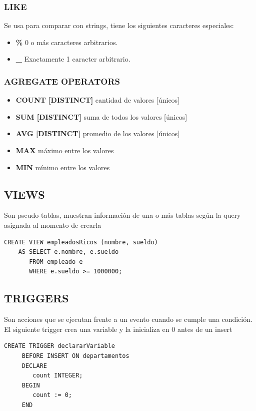 \documentclass[11pt,letterpaper]{article}
\begin{document}
\subsubsection{LIKE}
Se usa para comparar con strings, tiene los siguientes caracteres especiales:
\begin{itemize}
	\item \textbf{\%} 0 o más caracteres arbitrarios.
	\item \textbf{\_} Exactamente 1 caracter arbitrario.
\end{itemize}
\subsubsection{AGREGATE OPERATORS}
\begin{itemize}
	\item \textbf{COUNT [DISTINCT]} cantidad de valores [únicos]
	\item \textbf{SUM [DISTINCT]} suma de todos los valores [únicos]
	\item \textbf{AVG [DISTINCT]} promedio de los valores [únicos]
	\item \textbf{MAX} máximo entre los valores
	\item \textbf{MIN} mínimo entre los valores
\end{itemize}

\subsection{VIEWS}
Son pseudo-tablas, muestran información de una o más tablas según la query asignada al momento de crearla
\begin{lstlisting}[frame=single]
	CREATE VIEW empleadosRicos (nombre, sueldo)
	AS SELECT e.nombre, e.sueldo
	   FROM empleado e
	   WHERE e.sueldo >= 1000000;
\end{lstlisting}

\subsection{TRIGGERS}
Son acciones que se ejecutan frente a un evento cuando se cumple una condición. 
El siguiente trigger crea una variable y la inicializa en 0 antes de un insert
\begin{lstlisting}[frame=single]
	 CREATE TRIGGER declararVariable
     BEFORE INSERT ON departamentos
  	 DECLARE
     	count INTEGER;
     BEGIN
     	count := 0;
     END
\end{lstlisting}
\end{document}
